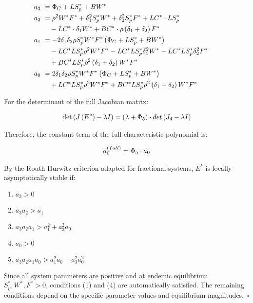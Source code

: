 \documentclass[10pt]{NSP1}
\newcommand{\fitwidth}[1]{\resizebox{\ifdim\width>\linewidth\linewidth\else\width\fi}{!}{#1}}
\begin{document}
\[
\fitwidth{$\displaystyle \begin{aligned}
a_{3}\ &= \Phi_{C} + LS_{p}^{*} + BW^{*} \\
a_{2}\ &= \rho^{2}W^{*}F^{*} + \delta_{1}^{2}S_{p}^{*}W^{*} + \delta_{2}^{2}S_{p}^{*}F^{*} + LC^{*} \cdot LS_{p}^{*}\ \ \quad \\
&\quad - LC^{*} \cdot \delta_{1}W^{*} + BC^{*} \cdot \rho\left( \delta_{1} + \delta_{2} \right)F^{*} \\
a_{1}\ &= - 2\delta_{1}\delta_{2}\rho S_{p}^{*}W^{*}F^{*}\left( \Phi_{C} + LS_{p}^{*} + BW^{*} \right)\ \ \quad \\
&\quad - LC^{*}LS_{p}^{*}\rho^{2}W^{*}F^{*} - LC^{*}LS_{p}^{*}\delta_{1}^{2}W^{*} - LC^{*}LS_{p}^{*}\delta_{2}^{2}F^{*}\ \ \quad \\
&\quad + BC^{*}LS_{p}^{*}\rho^{2}\left( \delta_{1} + \delta_{2} \right)W^{*}F^{*} \\
a_{0}\ &= 2\delta_{1}\delta_{2}\rho S_{p}^{*}W^{*}F^{*}\left( \Phi_{C} + LS_{p}^{*} + BW^{*} \right)\ \ \quad \\
&\quad + LC^{*}LS_{p}^{*}\rho^{2}W^{*}F^{*} + BC^{*}LS_{p}^{*}\rho^{2}\left( \delta_{1} + \delta_{2} \right)W^{*}F^{*}\
\end{aligned}$}
\]

For the determinant of the full Jacobian matrix:

\[
\fitwidth{$\displaystyle \det\left( J\left( E^{*} \right) - \lambda I \right) = \left( \lambda + \Phi_{5} \right) \cdot det\left( J_{4} - \lambda I \right)$}
\]

Therefore, the constant term of the full characteristic polynomial is:

\[
\fitwidth{$\displaystyle a_{0}^{(full)} = \Phi_{5} \cdot a_{0}$}
\]

By the Routh-Hurwitz criterion adapted for fractional systems, \(E^{*}\) is locally asymptotically stable if:

\begin{enumerate}
\def\labelenumi{\arabic{enumi}.}
\item
  \(a_{3} > 0\)
\item
  \(a_{3}a_{2} > a_{1}\)
\item
  \(a_{3}a_{2}a_{1} > a_{1}^{2} + a_{3}^{2}a_{0}\)
\item
  \(a_{0} > 0\)
\item
  \(a_{3}a_{2}a_{1}a_{0} > a_{1}^{2}a_{0} + a_{3}^{2}a_{0}^{2}\)
\end{enumerate}

Since all system parameters are positive and at endemic equilibrium \(S_{p}^{*},W^{*},F^{*} > 0\), conditions (1) and (4) are automatically satisfied. The remaining conditions depend on the specific parameter values and equilibrium magnitudes.~$\square$
\end{document}
